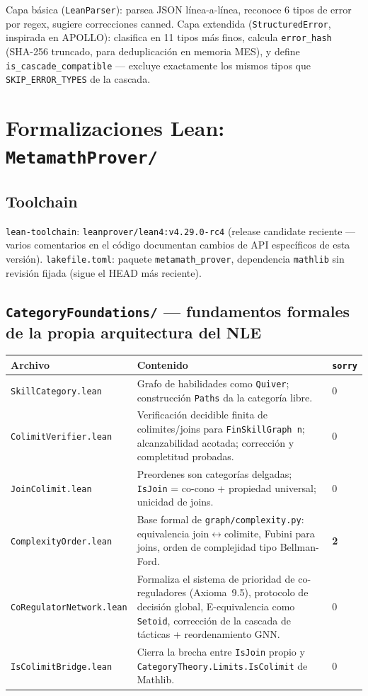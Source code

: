 \documentclass[11pt,a4paper]{report}
\newcommand{\code}[1]{\texttt{#1}}
\begin{document}
Capa b\'asica (\code{LeanParser}): parsea JSON l\'inea-a-l\'inea, reconoce 6 tipos de error por regex, sugiere correcciones canned. Capa extendida (\code{StructuredError}, inspirada en APOLLO): clasifica en 11 tipos m\'as finos, calcula \code{error\_hash} (SHA-256 truncado, para deduplicaci\'on en memoria MES), y define \code{is\_cascade\_compatible} --- excluye exactamente los mismos tipos que \code{SKIP\_ERROR\_TYPES} de la cascada.

\section{Formalizaciones Lean: \code{MetamathProver/}}
\label{sec:lean-formal}

\subsection{Toolchain}
\code{lean-toolchain}: \code{leanprover/lean4:v4.29.0-rc4} (release candidate reciente --- varios comentarios en el c\'odigo documentan cambios de API espec\'ificos de esta versi\'on). \code{lakefile.toml}: paquete \code{metamath_prover}, dependencia \code{mathlib} sin revisi\'on fijada (sigue el HEAD m\'as reciente).

\subsection{\code{CategoryFoundations/} --- fundamentos formales de la propia arquitectura del NLE}

\begin{longtable}{@{}p{3.2cm}p{7.6cm}p{1.4cm}@{}}
\toprule
\textbf{Archivo} & \textbf{Contenido} & \textbf{\code{sorry}} \\
\midrule
\endhead
\code{SkillCategory.lean} & Grafo de habilidades como \code{Quiver}; construcci\'on \code{Paths} da la categor\'ia libre. & 0 \\
\code{ColimitVerifier.lean} & Verificaci\'on decidible finita de colimites/joins para \code{FinSkillGraph n}; alcanzabilidad acotada; correcci\'on y completitud probadas. & 0 \\
\code{JoinColimit.lean} & Preordenes son categor\'ias delgadas; \code{IsJoin} = co-cono + propiedad universal; unicidad de joins. & 0 \\
\code{ComplexityOrder.lean} & Base formal de \code{graph/complexity.py}: equivalencia join$\leftrightarrow$colimite, Fubini para joins, orden de complejidad tipo Bellman-Ford. & \textbf{2} \\
\code{CoRegulatorNetwork.lean} & Formaliza el sistema de prioridad de co-reguladores (Axioma~9.5), protocolo de decisi\'on global, E-equivalencia como \code{Setoid}, correcci\'on de la cascada de t\'acticas + reordenamiento GNN. & 0 \\
\code{IsColimitBridge.lean} & Cierra la brecha entre \code{IsJoin} propio y \code{CategoryTheory.Limits.IsColimit} de Mathlib. & 0 \\
\bottomrule
\end{longtable}
\end{document}
